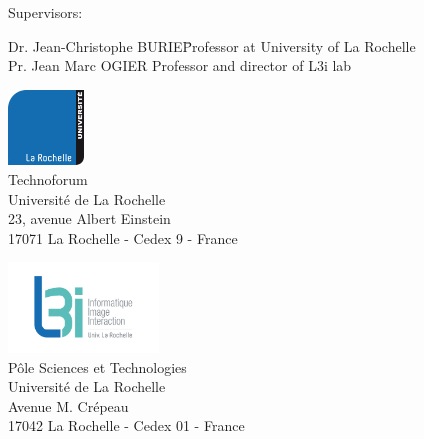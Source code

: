 {{\begin{center}
	\begin{normalsize}
		Supervisors:\\
	\end{normalsize}
	\parbox{15cm}{
		\begin{tabbing}
			Dr. Jean-Christophe BURIE\hspace{5em}\= Professor at University of La Rochelle\\
			Pr. Jean Marc OGIER\> Professor and director of L3i lab\\
		
		\end{tabbing}
	}
	\bigskip\bigskip\bigskip
\end{center}

\begin{minipage}{0.5\textwidth}
\begin{flushleft}
    \includegraphics[width=2cm]{fig/logo_UnivLR2011.png}\\
    Technoforum \\
    Université de La Rochelle \\
    23, avenue Albert Einstein \\
    17071 La Rochelle - Cedex 9 - France
\end{flushleft}
\end{minipage}
\begin{minipage}{0.5\textwidth}
\begin{flushright}
    \includegraphics[width=4cm]{fig/L3I-LOGO-quadri1.jpg}\\
    Pôle Sciences et Technologies \\
    Université de La Rochelle\\    
    Avenue M. Crépeau\\	
    17042 La Rochelle - Cedex 01 - France
\end{flushright}
\end{minipage}


}}
